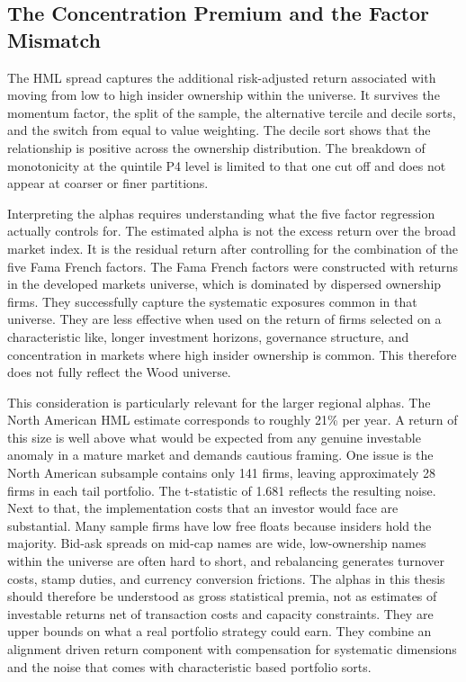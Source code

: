 \subsection{The Concentration Premium and the Factor Mismatch}

The HML spread captures the additional risk-adjusted return associated with moving from low to high insider ownership within the universe. It survives the momentum factor, the split of the sample, the alternative tercile and decile sorts, and the switch from equal to value weighting. The decile sort shows that the relationship is positive across the ownership distribution. The breakdown of monotonicity at the quintile P4 level is limited to that one cut off and does not appear at coarser or finer partitions. 

Interpreting the alphas requires understanding what the five factor regression actually controls for. The estimated alpha is not the excess return over the broad market index. It is the residual return after controlling for the combination of the five Fama French factors. The Fama French factors were constructed with returns in the developed markets universe, which is dominated by dispersed ownership firms. They successfully capture the systematic exposures common in that universe. They are less effective when used on the return of firms selected on a characteristic like, longer investment horizons, governance structure, and concentration in markets where high insider ownership is common. This therefore does not fully reflect the Wood universe.

This consideration is particularly relevant for the larger regional alphas. The North American HML estimate corresponds to roughly 21\% per year. A return of this size is well above what would be expected from any genuine investable anomaly in a mature market and demands cautious framing. One issue is the North American subsample contains only 141 firms, leaving approximately 28 firms in each tail portfolio. The t-statistic of 1.681 reflects the resulting noise. Next to that, the implementation costs that an investor would face are substantial. Many sample firms have low free floats because insiders hold the majority. Bid-ask spreads on mid-cap names are wide, low-ownership names within the universe are often hard to short, and rebalancing generates turnover costs, stamp duties, and currency conversion frictions. The alphas in this thesis should therefore be understood as gross statistical premia, not as estimates of investable returns net of transaction costs and capacity constraints. They are upper bounds on what a real portfolio strategy could earn. They combine an alignment driven return component with compensation for systematic dimensions and the noise that comes with characteristic based portfolio sorts.


